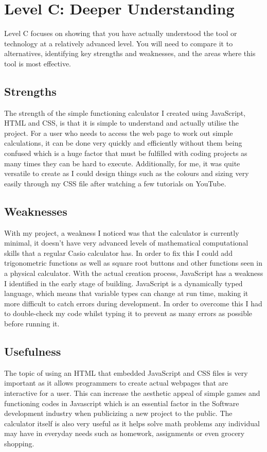 \documentclass[a4paper, 11pt]{report}
\begin{document}

\newpage
\section{Level C: Deeper Understanding}

Level C focuses on showing that you have actually understood the tool or technology at a relatively advanced level. You will need to compare it to alternatives, identifying key strengths and weaknesses, and the areas where this tool is most effective. 

\subsection{Strengths}
The strength of the simple functioning calculator I created using JavaScript, HTML and CSS, is that it is simple to understand and actually utilise the project. For a user who needs to access the web page to work out simple calculations, it can be done very quickly and efficiently without them being confused which is a huge factor that must be fulfilled with coding projects as many times they can be hard to execute. Additionally, for me, it was quite versatile to create as I could design things such as the colours and sizing very easily through my CSS file after watching a few tutorials on YouTube.

\subsection{Weaknesses}
With my project, a weakness I noticed was that the calculator is currently minimal, it doesn't have very advanced levels of mathematical computational skills that a regular Casio calculator has. In order to fix this I could add trigonometric functions as well as square root buttons and other functions seen in a physical calculator. With the actual creation process, JavaScript has a weakness I identified in the early stage of building. JavaScript is a dynamically typed language, which means that variable types can change at run time, making it more difficult to catch errors during development. In order to overcome this I had to double-check my code whilst typing it to prevent as many errors as possible before running it.

\subsection{Usefulness}
The topic of using an HTML that embedded JavaScript and CSS files is very important as it allows programmers to create actual webpages that are interactive for a user. This can increase the aesthetic appeal of simple games and functioning codes in Javascript which is an essential factor in the Software development industry when publicizing a new project to the public. The calculator itself is also very useful as it helps solve math problems any individual may have in everyday needs such as homework, assignments or even grocery shopping. 
\cite{LevelC1}
\end{document}
